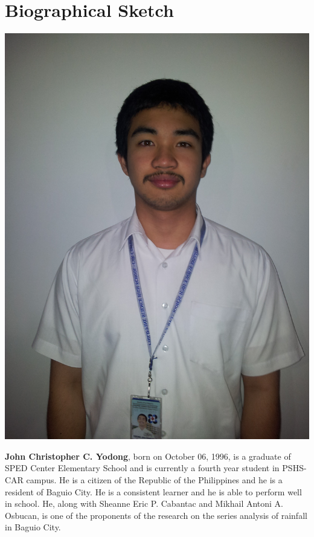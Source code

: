 \chapter*{Biographical Sketch}
\noindent
\begin{minipage}{0.3\textwidth}
\includegraphics[width=0.8\linewidth]{2013-03-04-17-00-28}
\end{minipage}\hfill
\begin{minipage}{0.68\textwidth}
\textbf{John Christopher C. Yodong}, born on October 06, 1996, is a graduate of SPED Center Elementary School and is currently a fourth year student in PSHS-CAR campus. He is a citizen of the Republic of the Philippines and he is a resident of Baguio City. He is a consistent learner and he is able to perform well in school.  He, along with Sheanne Eric P. Cabantac and Mikhail Antoni A. Osbucan, is one of the proponents of the research on the series analysis of rainfall in Baguio City. 
\end{minipage}

\vfill


